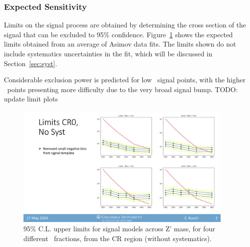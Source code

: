 \clearpage
\subsubsection{Expected Sensitivity}
\label{subsec:fit_expsens}

Limits on the signal process are obtained by determining the cross section of the signal that can be excluded to 95\% confidence. 
Figure~\ref{fig:limits_exp_1D} shows the expected limits obtained from an average of Asimov data fits. The limits shown do not include systematics uncertainties in the fit, which will be discussed in Section~\ref{sec:syst}. 

Considerable exclusion power is predicted for low \rinv~signal points, with the higher \rinv~points presenting more difficulty due to the very broad signal bump. 
TODO: update limit plots

\begin{figure}[!htbp]
\centering
   \includegraphics[width=0.95\textwidth]{figures/stats/limits_exp_1D}
    \caption{95\% C.L. upper limits for signal models across Z' mass, for four different \rinv~fractions, from the CR region (without systematics).
    \label{fig:limits_exp_1D}}
\end{figure}

